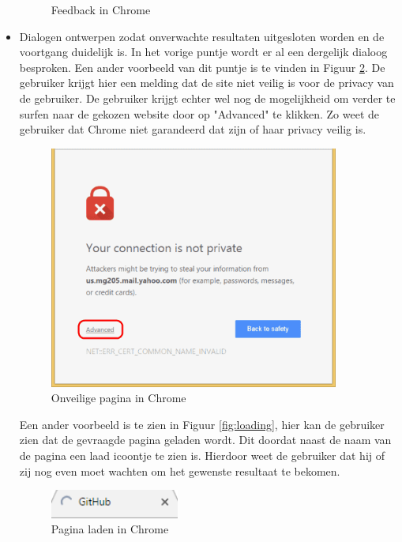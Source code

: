 \documentclass[12pt]{article}
\begin{document}
\begin{itemize}
\begin{figure}
  \caption{Feedback in Chrome}
  \label{fig:nochanges}
\end{figure}
\newpage
\item Dialogen ontwerpen zodat onverwachte resultaten uitgesloten worden en de voortgang duidelijk is.
\newline
In het vorige puntje wordt er al een dergelijk dialoog besproken.
Een ander voorbeeld van dit puntje is te vinden in Figuur \ref{fig:privatecon}. De gebruiker krijgt hier een melding dat de site niet veilig is voor de privacy van de gebruiker. De gebruiker krijgt echter wel nog de mogelijkheid om verder te surfen naar de gekozen website door op "Advanced" te klikken. Zo weet de gebruiker dat Chrome niet garandeerd dat zijn of haar privacy veilig is.
\newline
\begin{figure}
  \centering
    \includegraphics[width=0.9\textwidth]{Chrome-Advanced.png}
  \caption{Onveilige pagina in Chrome}
  \label{fig:privatecon}
\end{figure}
Een ander voorbeeld is te zien in Figuur \ref{fig:loading}, hier kan de gebruiker zien dat de gevraagde pagina geladen wordt. Dit doordat naast de naam van de pagina een laad icoontje te zien is. Hierdoor weet de gebruiker dat hij of zij nog even moet wachten om het gewenste resultaat te bekomen.
\begin{figure}
  \centering
    \includegraphics[width=0.4\textwidth]{Loading.png}
  \caption{Pagina laden in Chrome}

\end{figure}
\end{itemize}
\end{document}
